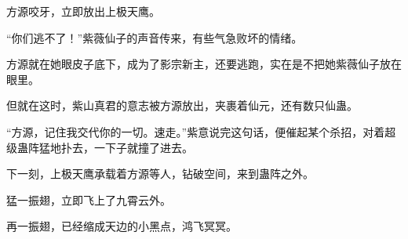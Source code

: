 \begin{this_body}
方源咬牙，立即放出上极天鹰。

“你们逃不了！”紫薇仙子的声音传来，有些气急败坏的情绪。

方源就在她眼皮子底下，成为了影宗新主，还要逃跑，实在是不把她紫薇仙子放在眼里。

但就在这时，紫山真君的意志被方源放出，夹裹着仙元，还有数只仙蛊。

“方源，记住我交代你的一切。速走。”紫意说完这句话，便催起某个杀招，对着超级蛊阵猛地扑去，一下子就撞了进去。

下一刻，上极天鹰承载着方源等人，钻破空间，来到蛊阵之外。

猛一振翅，立即飞上了九霄云外。

再一振翅，已经缩成天边的小黑点，鸿飞冥冥。

\end{this_body}

